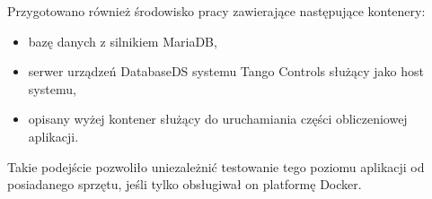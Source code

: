 Przygotowano również środowisko pracy zawierające następujące kontenery:
\begin{itemize}
    \item bazę danych z silnikiem MariaDB,
    \item serwer urządzeń DatabaseDS systemu Tango Controls służący jako host systemu,
    \item opisany wyżej kontener służący do uruchamiania części obliczeniowej aplikacji.
\end{itemize}

Takie podejście pozwoliło uniezależnić testowanie tego poziomu aplikacji od posiadanego sprzętu, jeśli tylko obsługiwał on platformę Docker.